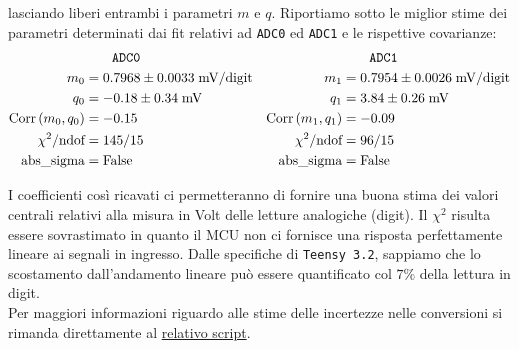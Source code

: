 \documentclass{article}[a4paper, oneside, 11pt]
\begin{document}
lasciando liberi entrambi i parametri $m$ e $q$. Riportiamo sotto le miglior
stime dei parametri determinati dai fit relativi ad \verb+ADC0+ ed \verb+ADC1+ 
e le rispettive covarianze:
\begin{align*}
	&\qquad \texttt{ADC0}	&&\qquad  \texttt{ADC1} \\
	m_0 &= 0.7968 \pm  0.0033  \; \mathrm{mV/digit} 
	& m_1  &= 0.7954 \pm 0.0026  \; \mathrm{mV/digit} \\
	q_0 &= - 0.18 \pm 0.34  \; \si{\mV} 	
	&q_1 &= 3.84  \pm 0.26  \; \si{\mV} \\
	\corr{m_0} {q_0} &= - 0.15      &\corr{m_1}{q_1} &= - 0.09 \\
	\chi^2/\text{ndof} &= 145/15	&\chi^2/\text{ndof} &= 96/15 \\ 
	\text{abs\_sigma} &= \rm False	&\text{abs\_sigma} &= \rm False
\end{align*}

\begin{figure}[H]%
\centering
\begin{subfigure}{.5\textwidth}
	\centering 
	\def\svgwidth{\columnwidth}
		
	\label{fig: cal0}
\end{subfigure}%
\begin{subfigure} {.5\textwidth}
	\centering 
	\def\svgwidth{\columnwidth}
		
	\label{fig: cal1}
\end{subfigure}
\end{figure}

I coefficienti cos\`i ricavati ci permetteranno di fornire una buona stima 
dei valori centrali relativi alla misura in Volt delle letture analogiche 
(digit). Il $\chi^2$ risulta essere sovrastimato in quanto il MCU non ci 
fornisce una risposta perfettamente lineare ai segnali in ingresso. Dalle 
specifiche di \verb+Teensy 3.2+, sappiamo che lo scostamento dall'andamento
lineare pu\`o essere quantificato col $7 \%$ della lettura in digit.\\
Per maggiori informazioni riguardo alle stime delle incertezze nelle 
conversioni si rimanda direttamente al 
\href{https://github.com/LucaCiucci/relaz_seme/blob/master/Cartella_fit/funzioni.py}
{relativo script}.
\end{document}
